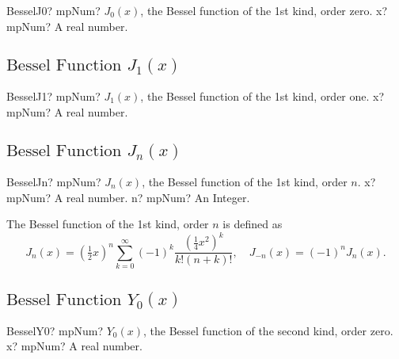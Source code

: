 \begin{mpFunctionsExtract}
	\mpFunctionOne
	{BesselJ0? mpNum? $J_0(x)$, the Bessel function of the 1st kind, order zero.}
	{x? mpNum? A real number.}
\end{mpFunctionsExtract}



\subsection{\texorpdfstring{$\text{Bessel Function }J_1(x)$}{J1x}}

\begin{mpFunctionsExtract}
	\mpFunctionOne
	{BesselJ1? mpNum? $J_1(x)$, the Bessel function of the 1st kind, order one.}
	{x? mpNum? A real number.}
\end{mpFunctionsExtract}




\subsection{\texorpdfstring{$\text{Bessel Function }J_n(x)$}{Jnx}}

\begin{mpFunctionsExtract}
	\mpFunctionTwo
	{BesselJn? mpNum? $J_n(x)$, the Bessel function of the 1st kind, order $n$.}
	{x? mpNum? A real number.}
	{n? mpNum? An Integer.}
\end{mpFunctionsExtract}

\vspace{0.3cm}
The Bessel function of the 1st kind, order $n$ is defined as
\begin{equation}
	J_n(x) = \left(\tfrac{1}{2}x \right)^n \sum_{k=0}^\infty (-1)^k \frac{\left(\tfrac{1}{4}x^2\right)^k}{k!(n+k)!}, \quad J_{-n}(x)=(-1)^n J_n(x).
\end{equation}







\subsection{\texorpdfstring{$\text{Bessel Function }Y_0(x)$}{Y0x}}

\begin{mpFunctionsExtract}
	\mpFunctionOne
	{BesselY0? mpNum? $Y_0(x)$, the Bessel function of the second kind, order zero.}
	{x? mpNum? A real number.}
\end{mpFunctionsExtract}



